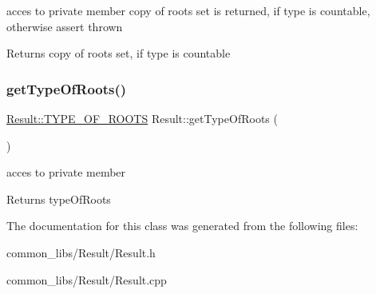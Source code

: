 acces to private member copy of roots set is returned, if type is countable, otherwise assert thrown \begin{DoxyReturn}{Returns}
copy of roots set, if type is countable 
\end{DoxyReturn}
\mbox{\label{classResult_a31f11436c4ec4716acfc281893f16297}} 
\subsubsection{\texorpdfstring{get\+Type\+Of\+Roots()}{getTypeOfRoots()}}
{\footnotesize\ttfamily \hyperlink{classResult_ae4448d298878f49e7adf0c7a9908f2e5}{Result\+::\+T\+Y\+P\+E\+\_\+\+O\+F\+\_\+\+R\+O\+O\+TS} Result\+::get\+Type\+Of\+Roots (\begin{DoxyParamCaption}{ }\end{DoxyParamCaption})}

acces to private member \begin{DoxyReturn}{Returns}
type\+Of\+Roots 
\end{DoxyReturn}


The documentation for this class was generated from the following files\+:\begin{DoxyCompactItemize}
\item 
common\+\_\+libs/\+Result/Result.\+h\item 
common\+\_\+libs/\+Result/Result.\+cpp\end{DoxyCompactItemize}

